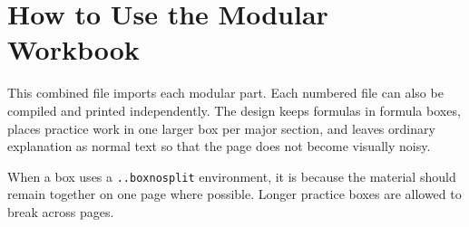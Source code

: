 \documentclass{otscience}
\begin{document}
\maketitle
\tableofcontents
\newpage

\section*{How to Use the Modular Workbook}
This combined file imports each modular part. Each numbered file can also be compiled and printed independently. The design keeps formulas in formula boxes, places practice work in one larger box per major section, and leaves ordinary explanation as normal text so that the page does not become visually noisy.

When a box uses a \texttt{..boxnosplit} environment, it is because the material should remain together on one page where possible. Longer practice boxes are allowed to break across pages.








\end{document}
